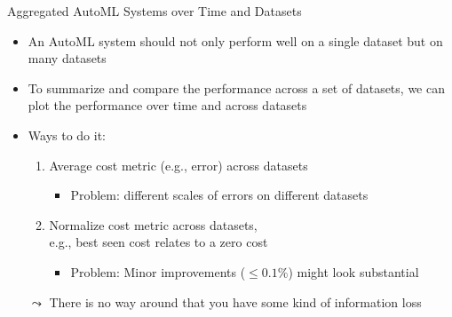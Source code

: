 \begin{frame}[c]{Aggregated AutoML Systems over Time and Datasets}

\begin{itemize}
	\item An AutoML system should not only perform well on a single dataset but on many datasets
	\item To summarize and compare the performance across a set of datasets,
	we can plot the performance over time and across datasets
	\pause
	\item Ways to do it:
	\begin{enumerate}
		\item Average cost metric (e.g., error) across datasets
		\begin{itemize}
			\item Problem: different scales of errors on different datasets
		\end{itemize}
	    \pause
	    \item Normalize cost metric across datasets,\\
	    e.g., best seen cost relates to a zero cost
	    \begin{itemize}
	    	\item Problem: Minor improvements ($\leq 0.1\%$) might look substantial
	    \end{itemize}
	\end{enumerate}
    \pause
    \item[$\leadsto$] There is no way around that you have some kind of information loss 
\end{itemize}

\end{frame}
